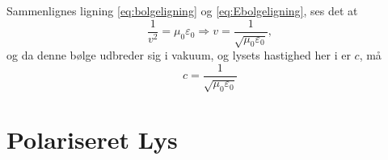 Sammenlignes ligning \ref{eq:bolgeligning} og \ref{eq:Ebolgeligning}, ses det at 
\begin{equation}
\frac{1}{v^2} = \mu_0\varepsilon_0 \Rightarrow v = \frac{1}{\sqrt{\mu_0\varepsilon_0}},
\end{equation}
og da denne bølge udbreder sig i vakuum, og lysets hastighed her i er $c$, må 
\begin{equation}
c = \frac{1}{\sqrt{\mu_0\varepsilon_0}}
\end{equation}

\section{Polariseret Lys}


